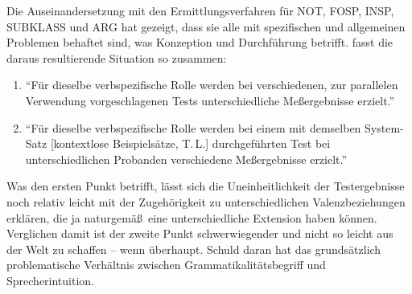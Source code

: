 
Die Auseinandersetzung mit den Ermittlungsverfahren für NOT, FOSP, INSP, SUBKLASS und ARG hat gezeigt, dass sie alle mit spezifischen und allgemeinen Problemen behaftet sind, was Konzeption und Durchführung betrifft. \citet[215]{Storrer:92} fasst die daraus resultierende Situation so zusammen: 

\begin{enumerate}
  \item "`Für dieselbe verbspezifische Rolle werden bei verschiedenen, zur parallelen Verwendung vorgeschlagenen Tests unterschiedliche Me\ss ergebnisse erzielt."'
  \item "`Für dieselbe verbspezifische Rolle werden bei einem mit demselben Sys\-tem-Satz [kontextlose Beispielsätze, T.\,L.] durchgeführten Test bei unterschiedlichen Probanden verschiedene Me\ss ergebnisse erzielt."' 
\end{enumerate}
Was den ersten Punkt betrifft, lässt sich die Uneinheitlichkeit der Testergebnisse noch relativ leicht mit der Zugehörigkeit zu unterschiedlichen Valenzbeziehungen erklären, die ja naturgemä\ss\ eine unterschiedliche Extension haben können. Verglichen damit ist der zweite Punkt schwerwiegender und nicht so leicht aus der Welt zu schaffen -- wenn überhaupt. Schuld daran hat das grundsätzlich problematische Verhältnis zwischen Grammatikalitätsbegriff und Sprecherintuition.

